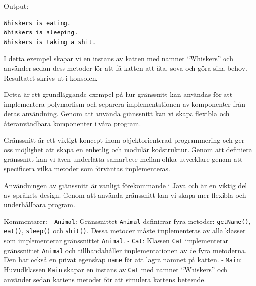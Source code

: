 \hypertarget{cb3}{}
\begin{Shaded}
\begin{Highlighting}[]
 \OperatorTok{\{}
   \OperatorTok{(}\OperatorTok{[]}\OperatorTok{)} \OperatorTok{\{}
\OperatorTok{=}  \OperatorTok{(}\OperatorTok{);}
\OperatorTok{();}
\OperatorTok{();}
\OperatorTok{();}
\OperatorTok{\}}
\OperatorTok{\}}
\end{Highlighting}
\end{Shaded}

Output:

\begin{verbatim}
Whiskers is eating.
Whiskers is sleeping.
Whiskers is taking a shit.
\end{verbatim}

I detta exempel skapar vi en instans av katten med namnet ``Whiskers''
och använder sedan dess metoder för att få katten att äta, sova och göra
sina behov. Resultatet skrivs ut i konsolen.

Detta är ett grundläggande exempel på hur gränssnitt kan användas för
att implementera polymorfism och separera implementationen av
komponenter från deras användning. Genom att använda gränssnitt kan vi
skapa flexibla och återanvändbara komponenter i våra program.

Gränssnitt är ett viktigt koncept inom objektorienterad programmering
och ger oss möjlighet att skapa en enhetlig och modulär kodstruktur.
Genom att definiera gränssnitt kan vi även underlätta samarbete mellan
olika utvecklare genom att specificera vilka metoder som förväntas
implementeras.

Användningen av gränssnitt är vanligt förekommande i Java och är en
viktig del av språkets design. Genom att använda gränssnitt kan vi skapa
mer flexibla och underhållbara program.

Kommentarer: - \texttt{Animal}: Gränssnittet \texttt{Animal} definierar
fyra metoder: \texttt{getName()}, \texttt{eat()}, \texttt{sleep()} och
\texttt{shit()}. Dessa metoder måste implementeras av alla klasser som
implementerar gränssnittet \texttt{Animal}. - \texttt{Cat}: Klassen
\texttt{Cat} implementerar gränssnittet \texttt{Animal} och
tillhandahåller implementationen av de fyra metoderna. Den har också en
privat egenskap \texttt{name} för att lagra namnet på katten. -
\texttt{Main}: Huvudklassen \texttt{Main} skapar en instans av
\texttt{Cat} med namnet ``Whiskers'' och använder sedan kattens metoder
för att simulera kattens beteende.


